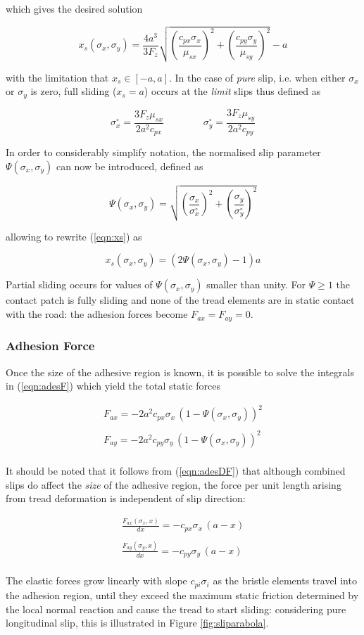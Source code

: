 \documentclass[12pt,a4paper]{report}
\newcommand{\eq}[2]{
\begin{equation} \label{#1}
#2
\end{equation}
}
\newcommand{\req}[1]{
(\ref{#1})
}
\begin{document}
which gives the desired solution

\eq{eqn:xs}{ x_s(\sigma_x , \sigma_y)=\frac{4a^3}{3F_z}\sqrt{\left(\frac{c_{px} \sigma_x}{\mu_{sx}}\right)^2 + \left(\frac{c_{py} \sigma_y}{\mu_{sy}}\right)^2}-a}
with the limitation that $x_s \in [-a,a]$.
In the case of \emph{pure} slip, i.e. when either $\sigma_x$ or $\sigma_y$ is zero, full sliding ($x_s = a$) occurs at the \emph{limit} slips thus defined as

\eq{eqn:limitslips}{\sigma^\circ_x = \frac{3F_z \mu_{sx}}{2a^2c_{px}} \qquad \qquad \sigma^\circ_y = \frac{3F_z \mu_{sy}}{2a^2c_{py}}}

In order to considerably simplify notation, the normalised slip parameter $\Psi(\sigma_x,\sigma_y)$ can now be introduced, defined as

\eq{eqn:PSI}{\Psi(\sigma_x,\sigma_y) = \sqrt{\left(\frac{\sigma_x}{\sigma^\circ_x}\right)^2 + \left(\frac{\sigma_y}{\sigma^\circ_y}\right)^2}}

allowing to rewrite \req{eqn:xs} as

\eq{eqn:xsPsi}{x_s(\sigma_x,\sigma_y) = (2\Psi(\sigma_x,\sigma_y) - 1)a}

Partial sliding occurs for values of $\Psi(\sigma_x,\sigma_y)$ smaller than unity. For $\Psi \geqslant 1$ the contact patch is fully sliding and none of the tread elements are in static contact with the road: the adhesion forces become $F_{ax} = F_{ay} = 0$. 

\subsubsection*{Adhesion Force}
Once the size of the adhesive region is known, it is possible to solve the integrals in \req{eqn:adesF} which yield the total static forces
\eq{eqn:adesFpsi}{
\begin{array}{c}
F_{ax} = -2a^2c_{px}\sigma_x \, (1-\Psi(\sigma_x,\sigma_y))^2\\
 \\
F_{ay} = -2a^2c_{py}\sigma_y \, (1-\Psi(\sigma_x,\sigma_y))^2\\
\end{array}
}
It should be noted that it follows from \req{eqn:adesDF} that although combined slips do affect the \emph{size} of the adhesive region, the force per unit length arising from tread deformation is independent of slip direction:
\eq{eqn:dfdx}{
\begin{array}{c}
\displaystyle \frac{F_{ax}(\sigma_x , x)}{dx} = -c_{px}\sigma_x \, (a-x)\\
 \\
\displaystyle \frac{F_{ay}(\sigma_y , x)}{dx} = -c_{py}\sigma_y \, (a-x)\\
\end{array}
}
The elastic forces grow linearly with slope $c_{p i} \sigma_i$ as the bristle elements travel into the adhesion region, until they exceed the maximum static friction determined by the local normal reaction and cause the tread to start sliding: considering pure longitudinal slip, this is illustrated in Figure \ref{fig:sliparabola}.
\end{document}
